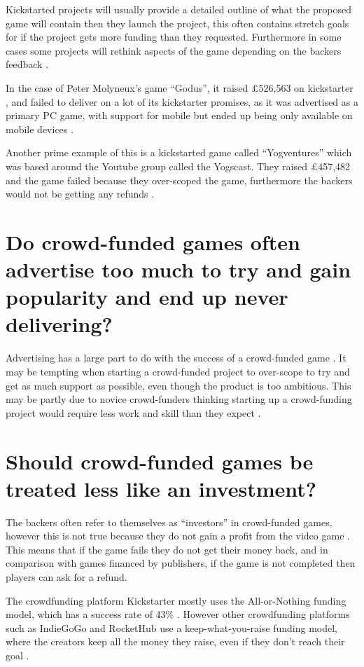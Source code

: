 \documentclass{scrartcl}
\begin{document}
Kickstarted projects will usually provide a detailed outline of what the proposed game will contain then they launch the project, this often contains stretch goals for if the project gets more funding than they requested. Furthermore in some cases some projects will rethink aspects of the game depending on the backers feedback \cite{smith2014}.

In the case of Peter Molyneux's game ``Godus'', it raised \pounds526,563 on kickstarter \cite{GodusKickstarter}, and failed to deliver on a lot of its kickstarter promises, as it was advertised as a primary PC game, with support for mobile but ended up being only available on mobile devices \cite{GodusFailure}.

Another prime example of this is a kickstarted game called ``Yogventures'' which was based around the Youtube group called the Yogscast. They raised \pounds457,482 and the game failed because they over-scoped the game, furthermore the backers would not be getting any refunds \cite{YogventuresFailure}.


\section{ Do crowd-funded games often advertise too much to try and gain popularity and end up never delivering?}

Advertising has a large part to do with the success of a crowd-funded game \cite{qiu2013, Greenberg:2013}.  It may be tempting when starting a crowd-funded project to over-scope to try and get as much support as possible, even though the product is too ambitious. This may be partly due to novice crowd-funders thinking starting up a crowd-funding project would require less work and skill than they expect \cite{xu2014show}.

\section{Should crowd-funded games be treated less like an investment?}

The backers often refer to themselves as ``investors'' in crowd-funded games, however this is not true because they do not gain a profit from the video game \cite{Harris:2013}. This means that if the game fails they do not get their money back, and in comparison with games financed by publishers, if the game is not completed then players can ask for a refund.

The crowdfunding platform Kickstarter mostly uses the All-or-Nothing funding model, which has a success rate of 43\% \cite{gerber2012crowdfunding}. However other crowdfunding platforms such as IndieGoGo and RocketHub use a keep-what-you-raise funding model, where the creators keep all the money they raise, even if they don't reach their goal \cite{gerber2012crowdfunding}.
\end{document}
